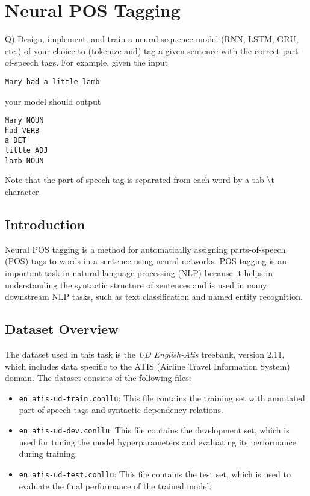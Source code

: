 

\section{Neural POS Tagging}

Q) Design, implement, and train a neural sequence model (RNN, LSTM, GRU, etc.) of your choice to (tokenize and) tag a given sentence with the correct part-of-speech tags. For example, given the input\par
\texttt{Mary had a little lamb}\par
your model should output\par
\texttt{Mary    NOUN\\
had VERB\\
a   DET\\
little  ADJ\\
lamb    NOUN}\par
Note that the part-of-speech tag is separated from each word by a tab \textbackslash t character.\par

\subsection{Introduction}

Neural POS tagging is a method for automatically assigning parts-of-speech (POS) tags to words in a sentence using neural networks. POS tagging is an important task in natural language processing (NLP) because it helps in understanding the syntactic structure of sentences and is used in many downstream NLP tasks, such as text classification and named entity recognition.


\subsection{Dataset Overview}

The dataset used in this task is the \textit{UD English-Atis} treebank, version 2.11, which includes data specific to the ATIS (Airline Travel Information System) domain. The dataset consists of the following files:

\begin{itemize}
    \item \texttt{en\_atis-ud-train.conllu}: This file contains the training set with annotated part-of-speech tags and syntactic dependency relations.
    
    \item \texttt{en\_atis-ud-dev.conllu}: This file contains the development set, which is used for tuning the model hyperparameters and evaluating its performance during training.
    
    \item \texttt{en\_atis-ud-test.conllu}: This file contains the test set, which is used to evaluate the final performance of the trained model.

\end{itemize}

